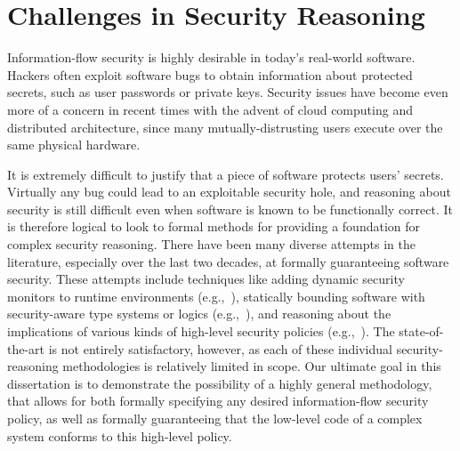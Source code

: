 \label{intro-chapter}
\section{Challenges in Security Reasoning}
\label{intro-challenges}

Information-flow security is highly desirable in today's real-world software.
Hackers often exploit software bugs to obtain information about 
protected secrets, such as user passwords or private keys. 
Security issues have become even more of a concern in recent
times with the advent of cloud computing and distributed 
architecture, since many mutually-distrusting users 
execute over the same physical hardware.

It is extremely difficult to justify that a piece of software
protects users' secrets. Virtually any bug could lead to
an exploitable security hole, and reasoning about security
is still difficult even when software is known to be 
functionally correct. It is therefore logical to look to formal 
methods for providing a foundation for complex security reasoning.
There have been many diverse attempts in the literature, especially 
over the last two decades, at formally guaranteeing software security.
These attempts include techniques like adding dynamic security 
monitors to runtime environments (e.g.,~\cite{austin09,guernic07,venkat06,shroff07}), 
statically bounding software 
with security-aware type systems or logics (e.g.,~\cite{jif,slam,hunt06,banerjee08}), 
and reasoning about the
implications of various kinds of high-level security policies
(e.g.,~\cite{rhtt,sabelfeld99}).
The state-of-the-art is not entirely satisfactory, however,
as each of these individual security-reasoning methodologies is 
relatively limited in scope. Our ultimate goal in this dissertation 
is to demonstrate the possibility of a highly general methodology,
that allows for both formally specifying any desired information-flow 
security policy, as well as formally guaranteeing that the low-level code 
of a complex system conforms to this high-level policy.

